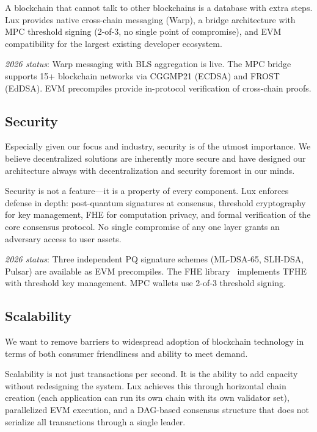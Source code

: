 \documentclass[11pt,a4paper]{article}
\begin{document}
A blockchain that cannot talk to other blockchains is a database with
extra steps. Lux provides native cross-chain messaging (Warp), a
bridge architecture with MPC threshold signing (2-of-3, no single
point of compromise), and EVM compatibility for the largest existing
developer ecosystem.

\medskip\noindent\textit{2026 status}: Warp messaging with BLS
aggregation is live. The MPC bridge~\cite{lux-mpc} supports 15+ blockchain networks
via CGGMP21 (ECDSA) and FROST (EdDSA). EVM precompiles provide
in-protocol verification of cross-chain proofs.

\subsection{Security}

Especially given our focus and industry, security is of the utmost
importance. We believe decentralized solutions are inherently more
secure and have designed our architecture always with decentralization
and security foremost in our minds.

Security is not a feature---it is a property of every component. Lux
enforces defense in depth: post-quantum signatures at consensus,
threshold cryptography for key management, FHE for computation privacy,
and formal verification of the core consensus protocol. No single
compromise of any one layer grants an adversary access to user assets.

\medskip\noindent\textit{2026 status}: Three independent PQ signature
schemes (ML-DSA-65, SLH-DSA, Pulsar) are available as EVM
precompiles. The FHE library~\cite{lux-fhe} implements TFHE with
threshold key management. MPC wallets use 2-of-3 threshold signing.

\subsection{Scalability}

We want to remove barriers to widespread adoption of blockchain
technology in terms of both consumer friendliness and ability to
meet demand.

Scalability is not just transactions per second. It is the ability to
add capacity without redesigning the system. Lux achieves this through
horizontal chain creation (each application can run its own chain with
its own validator set), parallelized EVM execution, and a DAG-based
consensus structure that does not serialize all transactions through a
single leader.
\end{document}

